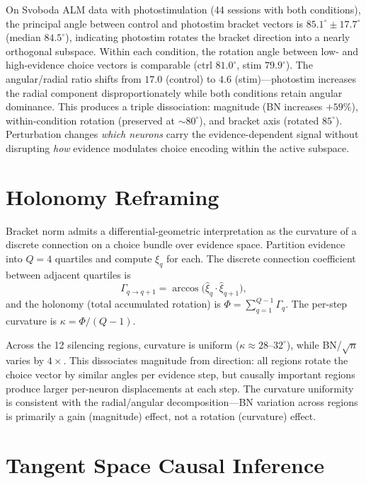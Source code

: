 \documentclass{article}
\begin{document}
On Svoboda ALM data with photostimulation \citep{dandi000007, dandi000009} (44 sessions with both conditions), the principal angle between control and photostim bracket vectors is $85.1^\circ \pm 17.7^\circ$ (median $84.5^\circ$), indicating photostim rotates the bracket direction into a nearly orthogonal subspace. Within each condition, the rotation angle between low- and high-evidence choice vectors is comparable (ctrl $81.0^\circ$, stim $79.9^\circ$). The angular/radial ratio shifts from $17.0$ (control) to $4.6$ (stim)---photostim increases the radial component disproportionately while both conditions retain angular dominance. This produces a triple dissociation: magnitude (BN increases $+59\%$), within-condition rotation (preserved at ${\sim}80^\circ$), and bracket axis (rotated $85^\circ$). Perturbation changes \emph{which neurons} carry the evidence-dependent signal without disrupting \emph{how} evidence modulates choice encoding within the active subspace.

\section{Holonomy Reframing}
\label{app:holonomy}

Bracket norm admits a differential-geometric interpretation as the curvature of a discrete connection on a choice bundle over evidence space. Partition evidence into $Q = 4$ quartiles and compute $\xi_q$ for each. The discrete connection coefficient between adjacent quartiles is
\[
\Gamma_{q \to q+1} = \arccos\!\bigl(\hat{\xi}_q \cdot \hat{\xi}_{q+1}\bigr),
\]
and the holonomy (total accumulated rotation) is $\Phi = \sum_{q=1}^{Q-1} \Gamma_q$. The per-step curvature is $\kappa = \Phi / (Q - 1)$.

Across the 12 silencing regions, curvature is uniform ($\kappa \approx 28$--$32^\circ$), while BN/\!$\sqrt{n}$ varies by $4\times$. This dissociates magnitude from direction: all regions rotate the choice vector by similar angles per evidence step, but causally important regions produce larger per-neuron displacements at each step. The curvature uniformity is consistent with the radial/angular decomposition---BN variation across regions is primarily a gain (magnitude) effect, not a rotation (curvature) effect.

\section{Tangent Space Causal Inference}
\label{app:tsci}
\end{document}
